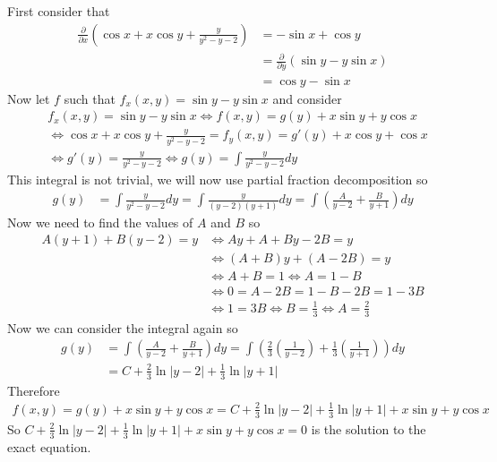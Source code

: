 \documentclass[notes]{subfiles}
\begin{document}
\begin{solution}
    First consider that
    \begin{align*}
        \frac{\partial}{\partial x}\left(\cos x + x\cos y + \frac{y}{y^2 - y - 2}\right)
        &= -\sin x + \cos y \\
        &= \frac{\partial}{\partial y}(\sin y - y\sin x) \\
        &= \cos y - \sin x
    \end{align*}
    Now let $f$ such that $f_x(x, y) = \sin y - y\sin x$ and consider
    \begin{align*}
        &f_x(x, y) = \sin y - y\sin x
        \iff f(x, y) = g(y) + x\sin y + y\cos x \\
        &\iff \cos x + x\cos y + \frac{y}{y^2 - y - 2} = f_y(x, y) = g'(y) + x\cos y + \cos x \\
        &\iff g'(y) = \frac{y}{y^2 - y - 2} \iff g(y) = \int \frac{y}{y^2 - y - 2} dy
    \end{align*}
    This integral is not trivial, we will now use partial fraction decomposition so
    \begin{align*}
        g(y)
        &= \int \frac{y}{y^2 - y - 2} dy
        = \int \frac{y}{(y - 2)(y + 1)}dy
        = \int \left( \frac{A}{y - 2} + \frac{B}{y + 1} \right)dy
    \end{align*}
    Now we need to find the values of $A$ and $B$ so
    \begin{align*}
        A(y + 1) + B(y - 2) = y
        &\iff Ay + A + By - 2B = y \\
        &\iff (A + B)y + (A - 2B) = y \\
        &\iff A + B = 1
        \iff A = 1 - B \\
        &\iff 0 = A - 2B = 1 - B - 2B = 1 - 3B \\
        &\iff 1 = 3B
        \iff B = \frac{1}{3} \iff A = \frac{2}{3}
    \end{align*}
    Now we can consider the integral again so
    \begin{align*}
        g(y)
        &= \int \left( \frac{A}{y - 2} + \frac{B}{y + 1} \right)dy
        = \int \left( \frac{2}{3}\left( \frac{1}{y - 2} \right) + \frac{1}{3}\left(\frac{1}{y + 1}\right) \right) dy \\
        &= C + \frac{2}{3}\ln|y - 2| + \frac{1}{3}\ln|y + 1|
    \end{align*}
    Therefore
    \begin{align*}
        f(x, y) = g(y) + x\sin y + y\cos x = C + \frac{2}{3}\ln|y - 2| + \frac{1}{3}\ln|y + 1| + x\sin y + y\cos x
    \end{align*}
    So $C + \frac{2}{3}\ln|y - 2| + \frac{1}{3}\ln|y + 1| + x\sin y + y\cos x = 0$ is the solution to the exact equation.
\end{solution}
\end{document}
